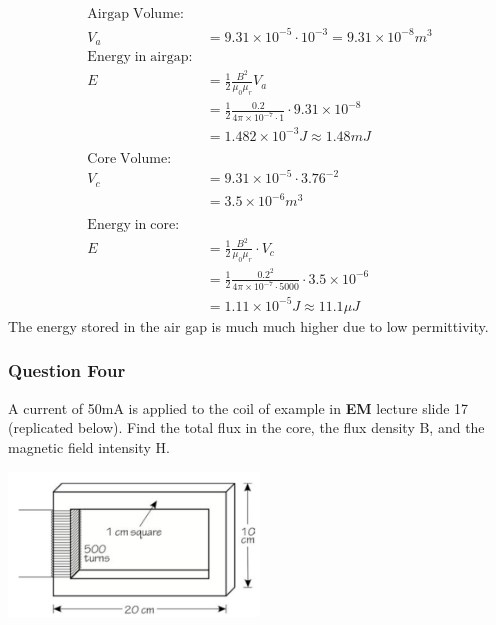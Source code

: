 \documentclass[a4paper,11pt]{article}
\begin{document}
\begin{enumerate}[i.]
          \begin{align*}
              \mathrm{Airgap\;Volume:}                                                             \\
              V_{a} & = 9.31\times10^{-5}\cdot 10^{-3} = 9.31\times10^{-8}m^3                      \\
              \mathrm{Energy\;in\;airgap:}                                                         \\
              E     & = \frac{1}{2}\frac{B^2}{\mu_0 \mu_r}V_{a}                                    \\
                    & = \frac{1}{2}\frac{0.2}{4\pi\times10^{-7}\cdot 1}\cdot 9.31\times10^{-8}     \\
                    & = 1.482\times 10^{-3}J \approx 1.48m J                                       \\\\
              \mathrm{Core\;Volume:}                                                               \\
              V_{c} & = 9.31\times10^{-5}\cdot 3.76^{-2}                                           \\
                    & = 3.5\times10^{-6}m^3                                                        \\\\
              \mathrm{Energy\;in\;core:}                                                           \\
              E     & = \frac{1}{2}\frac{B^2}{\mu_0 \mu_r}\cdot V_{c}                              \\
                    & = \frac{1}{2}\frac{0.2^2}{4\pi\times10^{-7}\cdot 5000}\cdot 3.5\times10^{-6} \\
                    & = 1.11\times 10^{-5}J \approx 11.1\mu J
          \end{align*}
          The energy stored in the air gap is much much higher due to low permittivity.
\end{enumerate}


\subsubsection*{Question Four}
A current of 50mA is applied to the coil of example in \textbf{EM} lecture slide 17 (replicated below). Find the total flux in the core, the flux density B, and the magnetic field intensity H.

\begin{center}
    \includegraphics[width=0.5\textwidth]{core.png}
\end{center}
\end{document}
